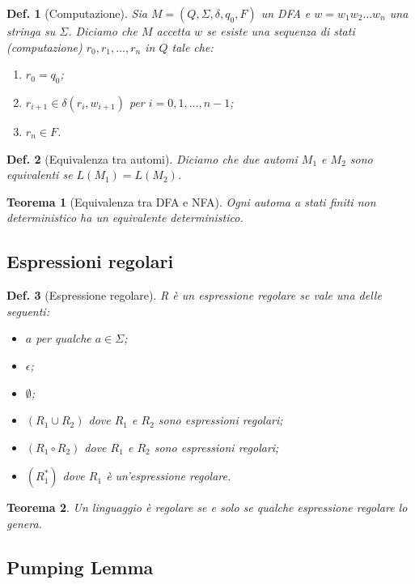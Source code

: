 \documentclass[11pt]{article}
\newtheorem{definition}{Def.}[section]
\newtheorem{theorem}{Teorema}[section]
\begin{document}
\begin{definition}[Computazione]
	Sia $M = (Q, \Sigma, \delta, q_0, F)$ un DFA e $w = w_1w_2 \dots w_n$ una
	stringa su $\Sigma$. Diciamo che $M$ accetta $w$ se esiste una sequenza di
	stati (computazione) $r_0, r_1, \dots, r_n$ in $Q$ tale che:
	\begin{enumerate}
		\item $r_0 = q_0$;
		\item $r_{i+1} \in \delta(r_i, w_{i+1})$ per $i = 0, 1, \dots, n-1$;
		\item $r_n \in F$.
	\end{enumerate}
\end{definition}

\begin{definition}[Equivalenza tra automi]
	Diciamo che due automi $M_1$ e $M_2$ sono equivalenti se $L(M_1) = L(M_2)$.
\end{definition}

\begin{theorem}[Equivalenza tra DFA e NFA]
	Ogni automa a stati finiti non deterministico ha un equivalente
	deterministico.
\end{theorem}

\subsection{Espressioni regolari}

\begin{definition}[Espressione regolare]
	R è un espressione regolare se vale una delle seguenti:
	\begin{itemize}
		\item $a$ per qualche $a \in \Sigma$;
		\item $\epsilon$;
		\item $\emptyset$;
		\item $(R_1 \cup R_2)$ dove $R_1$ e $R_2$ sono espressioni regolari;
		\item $(R_1 \circ R_2)$ dove $R_1$ e $R_2$ sono espressioni regolari;
		\item $(R_1^*)$ dove $R_1$ è un'espressione regolare.
	\end{itemize}
\end{definition}

\begin{theorem}
	Un linguaggio è regolare se e solo se qualche espressione regolare lo
	genera.
\end{theorem}

\subsection{Pumping Lemma}
\end{document}

